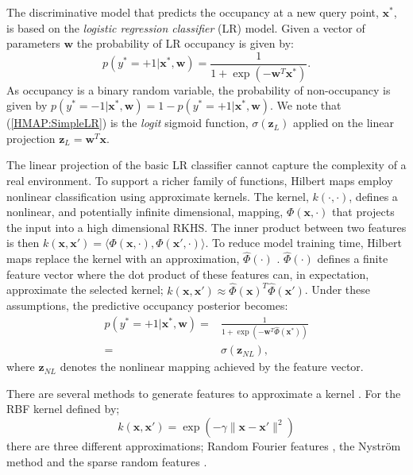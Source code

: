 \documentclass[letterpaper, 10 pt, conference]{ieeeconf}  %
\begin{document}
The discriminative model that predicts the occupancy at a new query point, $\boldsymbol{x}^*$, is based on the \textit{logistic regression classifier} (LR) model. Given a vector of parameters $\boldsymbol{w}$ the probability of LR occupancy is given by:
\begin{equation}\label{HMAP:SimpleLR}
	p(y^* = +1|\boldsymbol{x}^*,\boldsymbol{w}) = \frac{1}{1+\exp(-\boldsymbol{w}^T\boldsymbol{x}^*)}.
\end{equation} 
As occupancy is a binary random variable, the probability of non-occupancy is given by $p(y^* = -1|\boldsymbol{x}^*,\boldsymbol{w}) = 1 - p(y^* = +1|\boldsymbol{x}^*,\boldsymbol{w})$. We note that (\ref{HMAP:SimpleLR}) is the \textit{logit} sigmoid function, $\sigma(\boldsymbol{z}_L)$ applied on the linear projection $\boldsymbol{z}_L=\boldsymbol{w}^T\boldsymbol{x}$.

The linear projection of the basic LR classifier cannot capture the complexity of a real environment. To support a richer family of functions, Hilbert maps employ nonlinear classification using approximate kernels. The kernel, $k(\cdot, \cdot)$, defines a nonlinear, and potentially infinite dimensional, mapping, $\Phi(\boldsymbol{x},\cdot)$ that projects the input into a high dimensional RKHS. The inner product between two features is then $k(\boldsymbol{x},\boldsymbol{x}') = \langle \Phi(\boldsymbol{x},\cdot), \Phi(\boldsymbol{x}',\cdot) \rangle$. To reduce model training time, Hilbert maps replace the kernel with an approximation, $\hat{\Phi}(\cdot)$ \cite{Shalev-Shwartz2011}. $\hat{\Phi}(\cdot)$ defines a finite feature vector where the dot product of these features can, in expectation, approximate the selected kernel; $k(\boldsymbol{x},\boldsymbol{x}') \approx  \hat{\Phi}(\boldsymbol{x})^T\hat{\Phi}(\boldsymbol{x}')$. Under these assumptions, the predictive occupancy posterior becomes:
\begin{equation}\label{HMAP:Prediction}
\begin{split}
	p(y^* = +1|\boldsymbol{x}^*,\boldsymbol{w}) = & 
	\frac{1}{1+\exp(-\boldsymbol{w}^T \hat{\Phi}(\boldsymbol{x}^*))} \\
	= & \sigma(\boldsymbol{z}_{NL}),
\end{split}
\end{equation}
where $\boldsymbol{z}_{NL}$ denotes the nonlinear mapping achieved by the feature vector. 
 
There are several methods to generate features to approximate a kernel \cite{ramos2015hilbert}. For the RBF kernel defined by;
\begin{equation}\label{eq:RBF}
k(\boldsymbol{x},\boldsymbol{x}') = \exp(-\gamma\parallel \boldsymbol{x}-\boldsymbol{x}'\parallel^2)
\end{equation}
there are three different approximations; Random Fourier features \cite{NIPS2008_3495}, the Nystr\"{o}m method \cite{williams2001using} and the sparse random features \cite{melkumyan2009sparse}.
\end{document}
